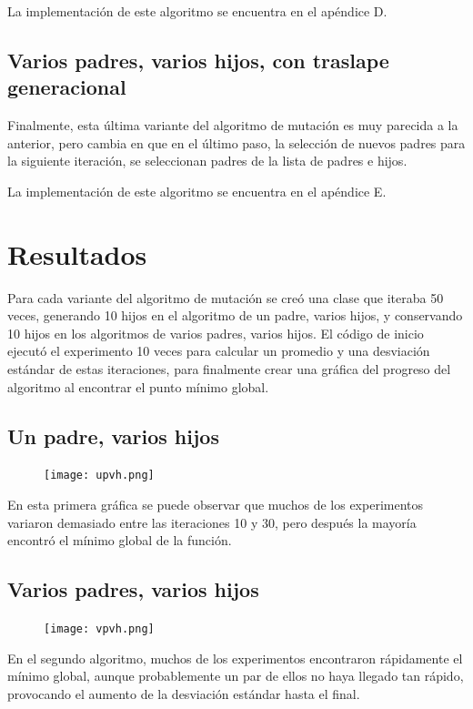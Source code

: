 \documentclass[sigconf,authorversion,nonacm]{acmart}
\begin{document}
La implementación de este algoritmo se encuentra en el apéndice D.

\subsection{Varios padres, varios hijos, con traslape generacional}
Finalmente, esta última variante del algoritmo de mutación es muy parecida a la anterior, pero cambia en que en el último paso, la selección de nuevos padres para la siguiente iteración, se seleccionan padres de la lista de padres e hijos.

La implementación de este algoritmo se encuentra en el apéndice E.

\vfill
\pagebreak

\section{Resultados}
Para cada variante del algoritmo de mutación se creó una clase que iteraba 50 veces, generando 10 hijos en el algoritmo de un padre, varios hijos, y conservando 10 hijos en los algoritmos de varios padres, varios hijos. El código de inicio ejecutó el experimento 10 veces para calcular un promedio y una desviación estándar de estas iteraciones, para finalmente crear una gráfica del progreso del algoritmo al encontrar el punto mínimo global.

\subsection{Un padre, varios hijos}
\begin{figure}[H]
  \centering
  \texttt{[image: upvh.png]}
\end{figure}

En esta primera gráfica se puede observar que muchos de los experimentos variaron demasiado entre las iteraciones 10 y 30, pero después la mayoría encontró el mínimo global de la función.

\subsection{Varios padres, varios hijos}
\begin{figure}[H]
  \centering
  \texttt{[image: vpvh.png]}
\end{figure}

En el segundo algoritmo, muchos de los experimentos encontraron rápidamente el mínimo global, aunque probablemente un par de ellos no haya llegado tan rápido, provocando el aumento de la desviación estándar hasta el final.
\end{document}
